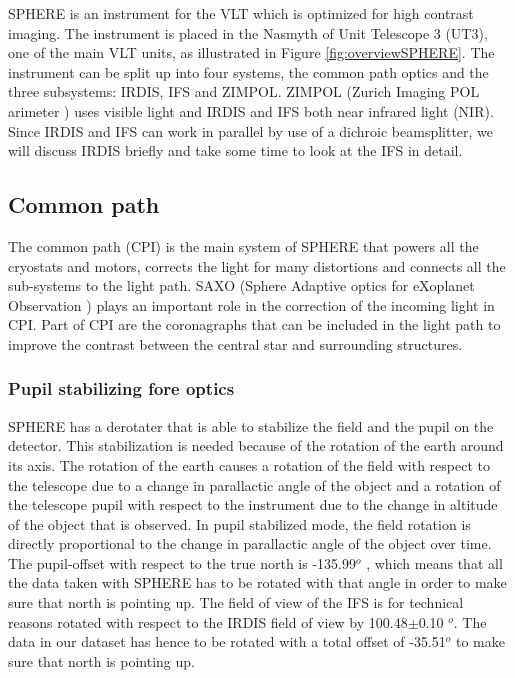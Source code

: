 \documentclass[twoside,single,12pt]{lion-msc}
\begin{document}
SPHERE is an instrument for the VLT which is optimized for high contrast imaging. The instrument is placed in the Nasmyth of Unit Telescope 3 (UT3), one of the main VLT units, as illustrated in Figure \ref{fig:overviewSPHERE}. The instrument can be split up into four systems, the common path optics and the three subsystems: IRDIS, IFS and ZIMPOL. ZIMPOL (Zurich Imaging POL arimeter \cite{Thalmann2008}) uses visible light and IRDIS and IFS both near infrared light (NIR). Since IRDIS and IFS can work in parallel by use of a dichroic beamsplitter, we will discuss IRDIS briefly and take some time to look at the IFS in detail.

\subsection{Common path}
The common path (CPI) is the main system of SPHERE that powers all the cryostats and motors, corrects the light for many distortions and connects all the sub-systems to the light path. SAXO (Sphere Adaptive optics for eXoplanet Observation \citep{Sauvage2010}) plays an important role in the correction of the incoming light in CPI. Part of CPI are the coronagraphs that can be included in the light path to improve the contrast between the central star and surrounding structures.

\subsubsection{Pupil stabilizing fore optics}
SPHERE has a derotater that is able to stabilize the field and the pupil on the detector. This stabilization is needed because of the rotation of the earth around its axis. The rotation of the earth causes a rotation of the field with respect to the telescope due to a change in parallactic angle of the object and a rotation of the telescope pupil with respect to the instrument due to the change in altitude of the object that is observed. In pupil stabilized mode, the field rotation is directly proportional to the change in parallactic angle of the object over time. The pupil-offset with respect to the true north is -135.99$^o$ , which means that all the data taken with SPHERE has to be rotated with that angle in order to make sure that north is pointing up. The field of view of the IFS is for technical reasons rotated with respect to the IRDIS field of view by 100.48$\pm$0.10 $^o$. The data in our dataset has hence to be rotated with a total offset of -35.51$^o$ to make sure that north is pointing up\cite{Maire2016}.
\bigskip
\end{document}
